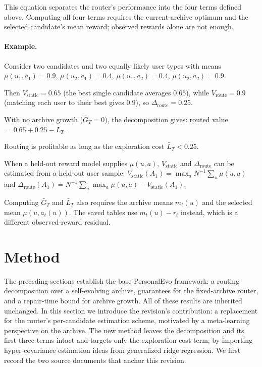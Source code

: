 \documentclass{article} %
\begin{document}
This equation separates the router's performance into the four terms defined
above. Computing all four terms requires the current-archive optimum and the
selected candidate's mean reward; observed rewards alone are not enough.

\paragraph{Example.} Consider two candidates and two equally likely user types with means $\mu(u_1,a_1)=0.9$, $\mu(u_2,a_1)=0.4$, $\mu(u_1,a_2)=0.4$, $\mu(u_2,a_2)=0.9$.

Then $V_{\mathrm{static}}=0.65$ (the best single candidate averages $0.65$), while $V_{\mathrm{route}}=0.9$ (matching each user to their best gives $0.9$), so $\Delta_{\mathrm{route}}=0.25$.

With no archive growth ($\bar G_T=0$), the decomposition gives: routed value $= 0.65 + 0.25 - \bar L_T$.

Routing is profitable as long as the exploration cost $\bar L_T < 0.25$.

When a held-out reward model supplies \(\mu(u,a)\),
\(V_{\mathrm{static}}\) and \(\Delta_{\mathrm{route}}\) can be estimated from a
held-out user sample:
\(V_{\mathrm{static}}(A_1)=\max_a N^{-1}\sum_u\mu(u,a)\) and
\(\Delta_{\mathrm{route}}(A_1)
=N^{-1}\sum_u\max_a\mu(u,a)-V_{\mathrm{static}}(A_1)\).

Computing \(\bar G_T\) and \(\bar L_T\) also requires the archive means
\(m_t(u)\) and the selected mean \(\mu(u,a_t(u))\). The saved tables use
\(m_t(u)-r_t\) instead, which is a different observed-reward residual.

\section{Method}

The preceding sections establish the base PersonalEvo framework: a routing decomposition over a self-evolving archive, guarantees for the fixed-archive router, and a repair-time bound for archive growth. All of these results are inherited unchanged. In this section we introduce the revision's contribution: a replacement for the router's per-candidate estimation scheme, motivated by a meta-learning perspective on the archive. The new method leaves the decomposition and its first three terms intact and targets only the exploration-cost term, by importing hyper-covariance estimation ideas from generalized ridge regression. We first record the two source documents that anchor this revision.
\end{document}
